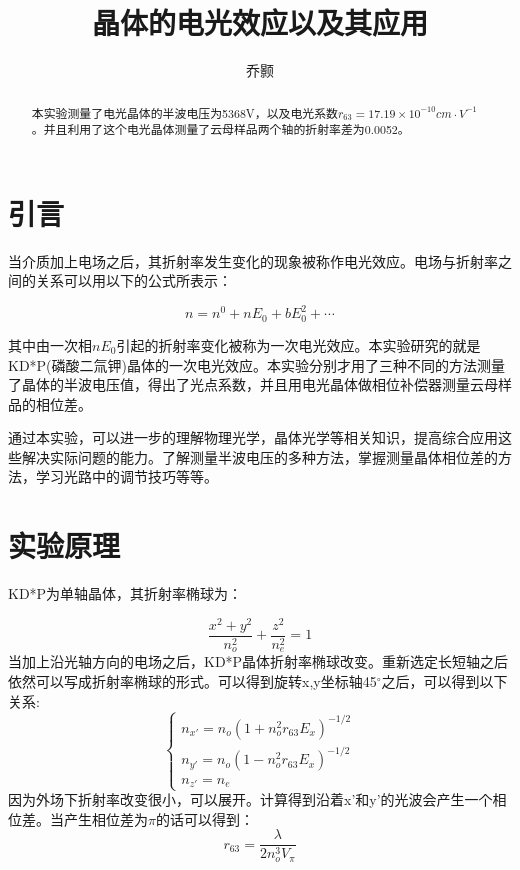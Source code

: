 \documentclass[aps,pre,12pt,preprint,onecolumn,showpacs,showkeys,UTF8]{revtex4-1}
\begin{document}
\title{\bf\heiti{}晶体的电光效应以及其应用\vspace{15mm}}
\author{\fangsong 乔颢\vspace{2mm}}
\begin{abstract} 
	\vspace{10mm}
	\begin{spacing}{1.5}
		\songti{}本实验测量了电光晶体的半波电压为5368V，以及电光系数$r_{63}=17.19\times10^{-10} cm \cdot V^{-1}$。并且利用了这个电光晶体测量了云母样品两个轴的折射率差为0.0052。
	\end{spacing}
\end{abstract}

\maketitle

\section{引言}
当介质加上电场之后，其折射率发生变化的现象被称作电光效应。电场与折射率之间的关系可以用以下的公式所表示：

\begin{equation}
	n=n^0+nE_0+bE_0^2+\cdots
\end{equation}

其中由一次相$nE_0$引起的折射率变化被称为一次电光效应。本实验研究的就是KD*P(磷酸二氚钾)晶体的一次电光效应。本实验分别才用了三种不同的方法测量了晶体的半波电压值，得出了光点系数，并且用电光晶体做相位补偿器测量云母样品的相位差。

通过本实验，可以进一步的理解物理光学，晶体光学等相关知识，提高综合应用这些解决实际问题的能力。了解测量半波电压的多种方法，掌握测量晶体相位差的方法，学习光路中的调节技巧等等。

\section{实验原理}
KD*P为单轴晶体，其折射率椭球为：

\begin{equation}
	\frac{x^2+y^2}{n_o^2}+\frac{z^2}{n_e^2}=1
\end{equation}
当加上沿光轴方向的电场之后，KD*P晶体折射率椭球改变。重新选定长短轴之后依然可以写成折射率椭球的形式。可以得到旋转x,y坐标轴45$^\circ$之后，可以得到以下关系:
\begin{displaymath}
	\left\{\begin{array}{l}
		n_{x'}=n_o(1+n_o^2r_{63}E_x)^{-1/2} \\
		n_{y'}=n_o(1-n_o^2r_{63}E_x)^{-1/2} \\
		n_{z'}=n_e
	\end{array}\right.
\end{displaymath}
因为外场下折射率改变很小，可以展开。计算得到沿着x'和y'的光波会产生一个相位差。当产生相位差为$\pi$的话可以得到：
\begin{equation}
	r_{63}=\frac{\lambda}{2n_o^3V_\pi}
\end{equation}
\end{document}
